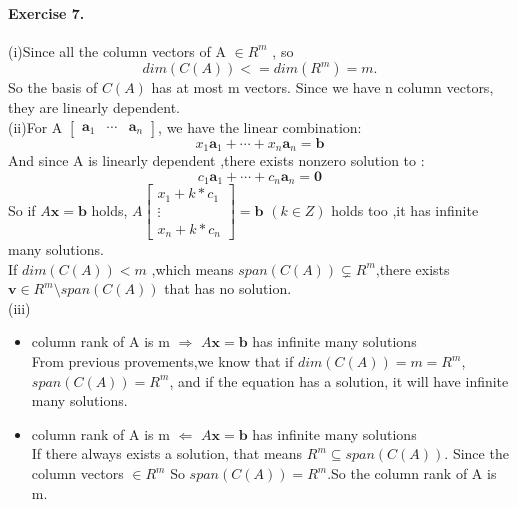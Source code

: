 \documentclass{article}
\begin{document}
\paragraph{Exercise 7.}
(i)Since all the column vectors of A $\in R^m$ , so \[
    dim(C(A))<=dim(R^m)=m.
\]
So the basis of $C(A)$ has at most m vectors. Since we have n column vectors, they are linearly dependent.\\
(ii)For A $\begin{bmatrix}
    \mathbf{a}_1 & \cdots & \mathbf{a}_n 
\end{bmatrix}$, we have the linear combination:
\[
x_1\mathbf{a}_1+\cdots + x_n\mathbf{a}_n = \mathbf{b}
\]
And since A is linearly dependent ,there exists nonzero solution to :
\[
    c_1\mathbf{a}_1+\cdots + c_n\mathbf{a}_n = \mathbf{0}
\]
So if $A\mathbf{x}=\mathbf{b}$ holds, $A \begin{bmatrix}
    x_1+k*c_1\\
    \vdots\\
    x_n+k*c_n
\end{bmatrix} = \mathbf{b}$ $(k\in Z)$ holds too ,it has infinite many solutions.\\
If $dim(C(A))<m$ ,which means $span(C(A)) \subsetneq R^m$,there exists $\mathbf{v}\in R^m \setminus span(C(A))$ that has no solution.\\
(iii)\begin{itemize}
    \item column rank of A is m $\Rightarrow$ $A\mathbf{x}=\mathbf{b}$ has infinite many solutions\\
        From previous provements,we know that if $dim(C(A))=m=R^m$, $span(C(A))=R^m$, and if the equation has a solution, it will have infinite many solutions.
    \item column rank of A is m $\Leftarrow$ $A\mathbf{x}=\mathbf{b}$ has infinite many solutions\\
        If there always exists a solution, that means $R^m \subseteq span(C(A))$. Since the column vectors $\in R^m$ So $span(C(A)) = R^m $.So the column rank of A is m.
\end{itemize}
\end{document}
